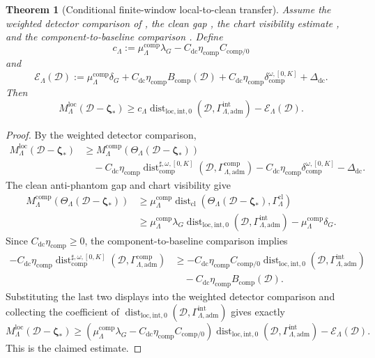 \documentclass[11pt]{article}
\numberwithin{equation}{section}
\newtheorem{theorem}{Theorem}[section]
\theoremstyle{definition}
\theoremstyle{remark}
\newcommand{\loc}{\mathrm{loc}}
\newcommand{\adm}{\mathrm{adm}}
\newcommand{\cl}{\mathrm{cl}}
\newcommand{\comp}{\mathrm{comp}}
\newcommand{\Dist}{\operatorname{dist}}
\newcommand{\calD}{\mathcal D}
\newcommand{\bzeta}{\boldsymbol\zeta}
\newcommand{\Gcomp}{\Gamma_{\Lambda,\adm}^{\comp}}
\begin{document}
\begin{theorem}[Conditional finite-window local-to-clean transfer]
\label{thm:local-to-clean-transfer}
Assume the weighted detector comparison of , the
clean gap , the chart visibility estimate
, and the component-to-baseline comparison
.  Define
\[
    c_{\Lambda}
    :=
    \mu_{\Lambda}^{\comp}\lambda_G
    -
    C_{\mathrm{dc}}\eta_{\comp}C_{\mathrm{comp}/0}
\]
and
\[
    \mathcal E_{\Lambda}(\calD)
    :=
    \mu_{\Lambda}^{\comp}\delta_G
    +
    C_{\mathrm{dc}}\eta_{\comp}B_{\comp}(\calD)
    +
    C_{\mathrm{dc}}\eta_{\comp}\delta_{\comp}^{\omega,[0,K]}
    +
    \Delta_{\mathrm{dc}}.
\]
Then
\[
    M_{\Lambda}^{\loc}(\calD-\bzeta_*)
    \ge
    c_{\Lambda}
    \Dist_{\loc,\mathrm{int},0}
    (\calD,\Gamma_{\Lambda,\adm}^{\mathrm{int}})
    -
    \mathcal E_{\Lambda}(\calD).
\]
\end{theorem}

\begin{proof}
By the weighted detector comparison,
\[
\begin{aligned}
    M_{\Lambda}^{\loc}(\calD-\bzeta_*)
    &\ge
    M_{\Lambda}^{\comp}(\Theta_{\Lambda}(\calD-\bzeta_*))\\
    &\quad-
    C_{\mathrm{dc}}\eta_{\comp}
    \Dist_{\comp}^{\sharp,\omega,[0,K]}(\calD,\Gcomp)
    -
    C_{\mathrm{dc}}\eta_{\comp}\delta_{\comp}^{\omega,[0,K]}
    -
    \Delta_{\mathrm{dc}}.
\end{aligned}
\]
The clean anti-phantom gap and chart visibility give
\[
\begin{aligned}
    M_{\Lambda}^{\comp}(\Theta_{\Lambda}(\calD-\bzeta_*))
    &\ge
    \mu_{\Lambda}^{\comp}
    \Dist_{\cl}(\Theta_{\Lambda}(\calD-\bzeta_*),\Gamma_{\Lambda}^{\cl})\\
    &\ge
    \mu_{\Lambda}^{\comp}\lambda_G
    \Dist_{\loc,\mathrm{int},0}
    (\calD,\Gamma_{\Lambda,\adm}^{\mathrm{int}})
    -
    \mu_{\Lambda}^{\comp}\delta_G.
\end{aligned}
\]
Since \(C_{\mathrm{dc}}\eta_{\comp}\ge0\), the component-to-baseline comparison
implies
\[
\begin{aligned}
    -C_{\mathrm{dc}}\eta_{\comp}
    \Dist_{\comp}^{\sharp,\omega,[0,K]}(\calD,\Gcomp)
    &\ge
    -C_{\mathrm{dc}}\eta_{\comp}C_{\mathrm{comp}/0}
    \Dist_{\loc,\mathrm{int},0}
    (\calD,\Gamma_{\Lambda,\adm}^{\mathrm{int}})\\
    &\quad-
    C_{\mathrm{dc}}\eta_{\comp}B_{\comp}(\calD).
\end{aligned}
\]
Substituting the last two displays into the weighted detector comparison and
collecting the coefficient of
\(\Dist_{\loc,\mathrm{int},0}
(\calD,\Gamma_{\Lambda,\adm}^{\mathrm{int}})\) gives exactly
\[
    M_{\Lambda}^{\loc}(\calD-\bzeta_*)
    \ge
    \left(
        \mu_{\Lambda}^{\comp}\lambda_G
        -
        C_{\mathrm{dc}}\eta_{\comp}C_{\mathrm{comp}/0}
    \right)
    \Dist_{\loc,\mathrm{int},0}
    (\calD,\Gamma_{\Lambda,\adm}^{\mathrm{int}})
    -
    \mathcal E_{\Lambda}(\calD).
\]
This is the claimed estimate.
\end{proof}
\end{document}
